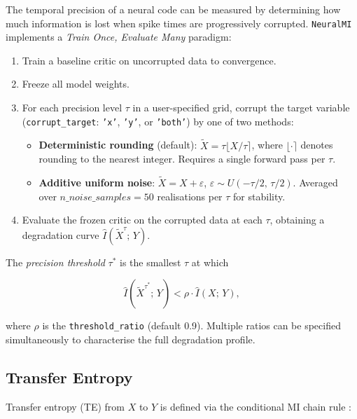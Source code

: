 \documentclass[12pt]{article}
\newcommand{\nmi}{\texttt{NeuralMI}}
\newcommand{\api}[1]{\texttt{#1}}
\begin{document}
The temporal precision of a neural code can be measured by determining how
much information is lost when spike times are progressively corrupted.
\nmi{} implements a \emph{Train Once, Evaluate Many} paradigm:

\begin{enumerate}[leftmargin=*]
  \item Train a baseline critic on uncorrupted data to convergence.
  \item Freeze all model weights.
  \item For each precision level $\tau$ in a user-specified grid, corrupt the
        target variable (\api{corrupt\_target}: \api{'x'}, \api{'y'}, or
        \api{'both'}) by one of two methods:
        \begin{itemize}
          \item \textbf{Deterministic rounding} (default):
                $\tilde{X} = \tau\lfloor X/\tau\rceil$, where $\lfloor\cdot\rceil$
                denotes rounding to the nearest integer.  Requires a single
                forward pass per $\tau$.
          \item \textbf{Additive uniform noise}:
                $\tilde{X} = X + \varepsilon$,
                $\varepsilon \sim U(-\tau/2,\,\tau/2)$.
                Averaged over $n\_noise\_samples=50$ realisations per $\tau$ for
                stability.
        \end{itemize}
  \item Evaluate the frozen critic on the corrupted data at each $\tau$,
        obtaining a degradation curve $\hat{I}(\tilde{X}^\tau;\,Y)$.
\end{enumerate}

The \emph{precision threshold} $\tau^*$ is the smallest $\tau$ at which

\begin{equation}
  \hat{I}(\tilde{X}^{\tau^*};\,Y) < \rho\cdot\hat{I}(X;\,Y),
  \label{eq:taustar}
\end{equation}

where $\rho$ is the \api{threshold\_ratio} (default 0.9).  Multiple ratios
can be specified simultaneously to characterise the full degradation profile.

\subsection{Transfer Entropy}
\label{sec:theory:te}

Transfer entropy (TE) from $X$ to $Y$ is defined via the conditional MI
chain rule \citep{schreiber2000measuring}:
\end{document}

